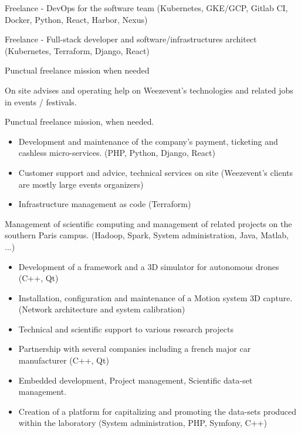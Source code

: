 

Freelance - DevOps for the software team (Kubernetes, GKE/GCP, Gitlab CI, Docker, Python, React, Harbor, Nexus)

\divider

Freelance - Full-stack developer and software/infrastructures architect (Kubernetes, Terraform, Django, React)

Punctual freelance mission when needed

\divider

On site advises and operating help on Weezevent's technologies and related jobs in events / festivals.

Punctual freelance mission, when needed.

\divider

\begin{itemize}
    \item Development and maintenance of the company's payment, ticketing and cashless micro-services. (PHP, Python, Django, React)
    \item Customer support and advice, technical services on site (Weezevent's clients are mostly large events organizers)
    \item Infrastructure management as code (Terraform)
\end{itemize}

\divider

Management of scientific computing and management of related projects on the southern Paris campus. (Hadoop, Spark, System administration, Java, Matlab, ...)

\divider

\begin{itemize}
    \item Development of a framework and a 3D simulator for autonomous drones (C++, Qt)
    \item Installation, configuration and maintenance of a Motion system 3D capture. (Network architecture and system calibration)
    \item Technical and scientific support to various research projects
    \item Partnership with several companies including a french major car manufacturer (C++, Qt)
    \item Embedded development, Project management, Scientific data-set management.
    \item Creation of a platform for capitalizing and promoting the data-sets produced within the laboratory (System administration, PHP, Symfony, C++)
\end{itemize}
